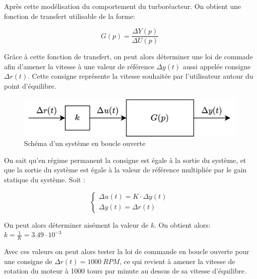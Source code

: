 \documentclass[12pt]{report}
\begin{document}
Après cette modélisation du comportement du turboréacteur. On obtient une 
fonction de transfert utilisable de la forme:

\begin{equation}
  G(p) = \frac{\Delta Y(p)}{\Delta U(p)}
\end{equation}

Grâce à cette fonction de transfert, on peut alors déterminer une loi de commade afin
d'amener la vitesse à une valeur de référence $\Delta y(t)$ aussi appelée consigne $\Delta r(t)$.
Cette consigne représente la vitesse souhaitée par l'utilisateur autour du point d'équilibre.

\begin{figure}[h]
  \centering
  \vspace{0.2cm}
  \includegraphics[scale=0.25]{fig/open_loop_system.png}
  \caption{Schéma d'un système en boucle ouverte}
\end{figure}

On sait qu'en régime permanent la consigne est égale à la sortie du système, et que
la sortie du système est égale à la valeur de référence multipliée par le gain
statique du système. Soit :

\begin{equation}
  \left\{
  \begin{matrix}
    \Delta u(t) = K \cdot \Delta y(t) \\
    \Delta y(t) = \Delta r(t)
  \end{matrix}
  \right.
\end{equation}

On peut alors déterminer aisément la valeur de $k$. On obtient alors: $k = \frac{1}{K} = 3.49 \cdot 10^{-3}$

Avec ces valeurs on peut alors tester la loi de commande en boucle ouverte 
pour une consigne de $\Delta r(t) = 1000 ~ RPM$, ce qui revient à amener la vitesse
de rotation du moteur à 1000 tours par minute au dessus de sa vitesse d'équilibre.
\end{document}
